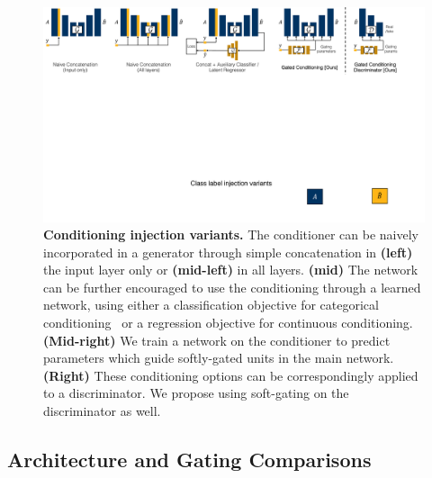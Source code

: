 \begin{figure}[t]
    \centering
    \includegraphics[width=\linewidth]{paper_images/arch_inject2.pdf}
    \caption{{\bf Conditioning injection variants.}
    The conditioner can be naively incorporated in a generator through simple concatenation in {\bf (left)} the input layer only or {\bf (mid-left)} in all layers. {\bf (mid)} The network can be further encouraged to use the conditioning through a learned network, using either a classification objective for categorical conditioning~\cite{odena2016conditional,chen2016infogan} or a regression objective for continuous conditioning. {\bf (Mid-right)} We train a network on the conditioner to predict parameters which guide softly-gated units in the main network. {\bf (Right)} These conditioning options can be correspondingly applied to a discriminator. We propose using soft-gating on the discriminator as well.\label{fig:arch-inj}
    \vspace{-2mm}
    }
    \vspace{-2mm}
\end{figure}

\subsection{Architecture and Gating Comparisons}

